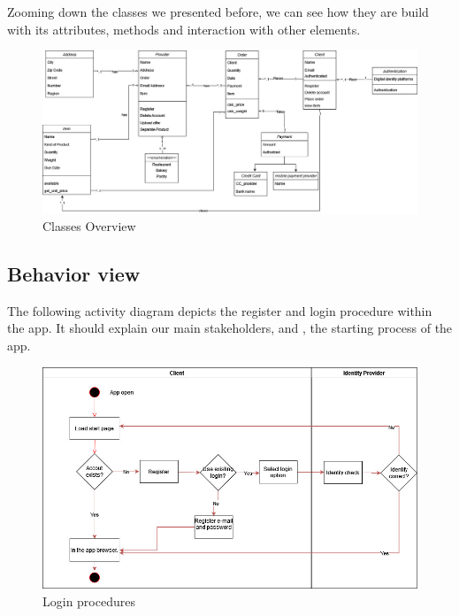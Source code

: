 \newpage
\thispagestyle{lscape}
\begin{landscape}

Zooming down the classes we presented before, we can see how they are build with its attributes, methods and
interaction with other elements.

\begin{figure}[H]
    \centering
    \includegraphics[width=1.5\textwidth]{assets/classes_CD.jpg}
    \caption{Classes Overview}
    \label{fig:class_CD}
\end{figure}

\end{landscape}

\subsection{Behavior view}

The following \gls{activity diagram} depicts the register and login procedure within the app. It should explain our
main stakeholders,  and , the starting process of the app.

\begin{figure}[H]
    \centering
    \includegraphics[width=1\textwidth]{assets/login_AC.jpg}
    \caption{Login procedures}
    \label{fig:login_register}
\end{figure}

